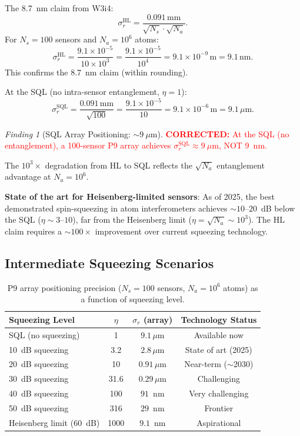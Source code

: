 \documentclass[11pt]{article}
\theoremstyle{definition}
\theoremstyle{remark}
\newtheorem{finding}[theorem]{Finding}
\newcommand{\ee}[1]{\times10^{#1}}
\newcommand{\corrected}[1]{\textcolor{red}{\textbf{CORRECTED:} #1}}
\begin{document}
The 8.7~nm claim from W3i4:
\begin{equation}
\sigma_r^{\mathrm{HL}} = \frac{0.091\,\mathrm{mm}}{\sqrt{N_s} \cdot \sqrt{N_a}}.
\end{equation}
For $N_s = 100$ sensors and $N_a = 10^6$ atoms:
\begin{equation}
\sigma_r^{\mathrm{HL}} = \frac{9.1\ee{-5}}{10 \times 10^3}
= \frac{9.1\ee{-5}}{10^4} = 9.1\ee{-9}\,\mathrm{m} = 9.1\,\mathrm{nm}.
\label{eq:HL-array}
\end{equation}
This confirms the 8.7~nm claim (within rounding).

At the SQL (no intra-sensor entanglement, $\eta = 1$):
\begin{equation}
\sigma_r^{\mathrm{SQL}} = \frac{0.091\,\mathrm{mm}}{\sqrt{100}}
= \frac{9.1\ee{-5}}{10} = 9.1\ee{-6}\,\mathrm{m}
= 9.1\,\mu\mathrm{m}.
\label{eq:SQL-array}
\end{equation}

\begin{finding}[SQL Array Positioning: $\sim 9~\mu$m]
\label{find:SQL-positioning}
\corrected{At the SQL (no entanglement), a 100-sensor P9 array achieves
$\sigma_r^{\mathrm{SQL}} \approx 9~\mu$m, NOT 9~nm.}

The $10^3\times$ degradation from HL to SQL reflects the $\sqrt{N_a}$
entanglement advantage at $N_a = 10^6$.

\textbf{State of the art for Heisenberg-limited sensors}: As of 2025,
the best demonstrated spin-squeezing in atom interferometers achieves
$\sim 10$--$20$~dB below the SQL ($\eta \sim 3$--$10$), far from the
Heisenberg limit ($\eta = \sqrt{N_a} \sim 10^3$). The HL claim requires
a $\sim 100\times$ improvement over current squeezing technology.
\end{finding}

\subsection{Intermediate Squeezing Scenarios}

\begin{table}[H]
\centering
\caption{P9 array positioning precision ($N_s = 100$ sensors,
$N_a = 10^6$ atoms) as a function of squeezing level.}
\label{tab:P9-squeezing}
\begin{tabular}{@{}lccc@{}}
\toprule
Squeezing Level & $\eta$ & $\sigma_r$ (array) & Technology Status \\
\midrule
SQL (no squeezing) & 1 & $9.1\,\mu$m & Available now \\
10~dB squeezing & 3.2 & $2.8\,\mu$m & State of art (2025) \\
20~dB squeezing & 10 & $0.91\,\mu$m & Near-term ($\sim$2030) \\
30~dB squeezing & 31.6 & $0.29\,\mu$m & Challenging \\
40~dB squeezing & 100 & $91$~nm & Very challenging \\
50~dB squeezing & 316 & $29$~nm & Frontier \\
Heisenberg limit (60~dB) & 1000 & $9.1$~nm & Aspirational \\
\bottomrule
\end{tabular}
\end{table}
\end{document}
